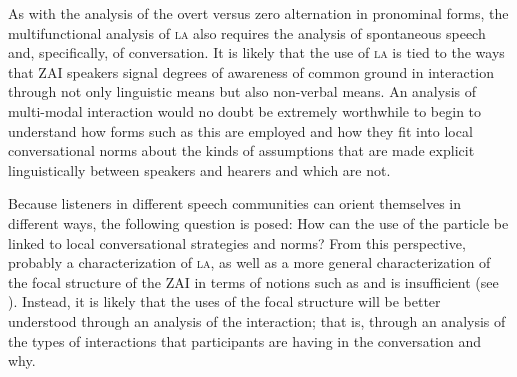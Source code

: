 As with the analysis of the overt versus zero alternation in  pro\-nominal forms, the multifunctional analysis of \textsc{la} also requires the analysis of spontaneous speech and, specifically, of conversation. It is likely that the use of \textsc{la} is tied to the ways that ZAI speakers signal degrees of awareness of common ground in interaction through not only linguistic means but also non-verbal means. An analysis of multi-modal interaction would no doubt be extremely worthwhile to begin to understand how forms such as this are employed and how they fit into local conversational norms about the kinds of assumptions that are made explicit linguistically between speakers and hearers and which are not. 

Because listeners in different speech communities can orient themselves in different ways, the following question is posed: How can the use of the particle be linked to local conversational strategies and norms? From this perspective, probably a characterization of \textsc{la}, as well as a more general characterization of the focal structure of the ZAI in terms of notions such as  and  is insufficient (see \citealt{matic2013,ozerov2015}). Instead, it is likely that the uses of the focal structure will be better understood through an analysis of the interaction; that is, through an analysis of the types of interactions that participants are having in the conversation and why.











